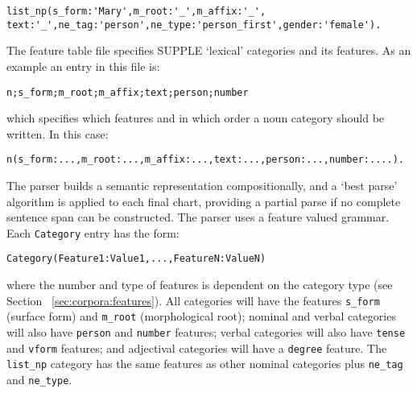 \begin{small}\begin{verbatim}
list_np(s_form:'Mary',m_root:'_',m_affix:'_',
text:'_',ne_tag:'person',ne_type:'person_first',gender:'female').
\end{verbatim}\end{small}




The feature table file specifies SUPPLE `lexical' categories and its
features.  As an example an entry in this file is:

\begin{small}\begin{verbatim}
n;s_form;m_root;m_affix;text;person;number
\end{verbatim}\end{small}


which specifies which features and in which order a noun category
should be written. In this case:

\begin{small}\begin{verbatim}
n(s_form:...,m_root:...,m_affix:...,text:...,person:...,number:....).
\end{verbatim}\end{small}


The parser builds a semantic representation compositionally, and a `best parse'
algorithm is applied to each final chart, providing a partial parse if no
complete sentence span can be constructed. The parser uses a feature valued
grammar. Each \texttt{Category} entry has the form:
\begin{small}\begin{verbatim}
Category(Feature1:Value1,...,FeatureN:ValueN)
\end{verbatim}\end{small}
where the number and type of features is dependent on the category
type (see Section ~\ref{sec:corpora:features}).  All categories will have the features \texttt{s\_form} (surface
form) and \texttt{m\_root} (morphological root); nominal and verbal
categories will also have \texttt{person} and \texttt{number}
features; verbal categories will also have \texttt{tense} and
\texttt{vform} features; and adjectival categories will have a
\texttt{degree} feature.  The \texttt{list\_np} category has the same
features as other nominal categories plus \texttt{ne\_tag} and
\texttt{ne\_type}.

